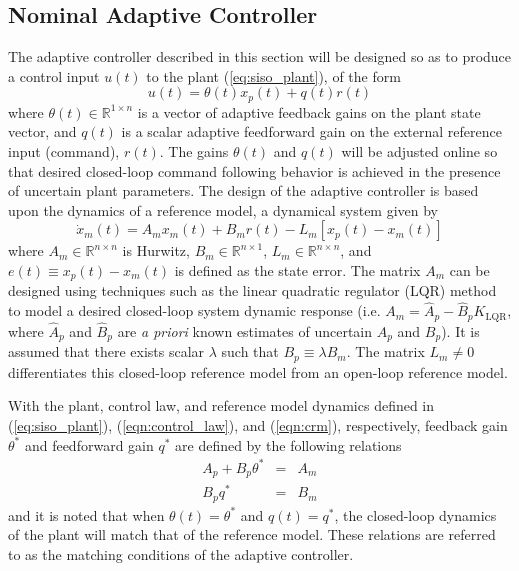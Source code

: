 \subsection{Nominal Adaptive Controller}
The adaptive controller described in this section will be designed so as to produce a control input $u(t)$ to the plant (\ref{eq:siso_plant}), of the form
\begin{equation}
	u(t) = \theta(t) x_p(t) + q(t) r(t)
	\label{eqn:control_law}
\end{equation}
\noindent where $\theta(t) \in \mathbb{R}^{1 \times n}$ is a vector of adaptive feedback gains on the plant state vector, and $q(t)$ is a scalar adaptive feedforward gain on the external reference input (command), $r(t)$. The gains $\theta(t)$ and $q(t)$ will be adjusted online so that desired closed-loop command following behavior is achieved in the presence of uncertain plant parameters. The design of the adaptive controller is based upon the dynamics of a reference model, a dynamical system given by
\begin{equation}
	\dot{x}_m(t) = A_m x_m(t) + B_m r(t) - L_m \left[x_p(t) - x_m(t)\right]
	\label{eqn:crm}
\end{equation}
\noindent where $A_m \in \mathbb{R}^{n \times n}$ is Hurwitz, $B_m \in \mathbb{R}^{n \times 1}$, $L_m \in \mathbb{R}^{n \times n}$, and $e(t) \equiv x_p(t) - x_m(t)$ is defined as the state error. The matrix $A_m$ can be designed using techniques such as the linear quadratic regulator (LQR) method to model a desired closed-loop system dynamic response (i.e. $A_m = \hat{A}_p - \hat{B}_p K_{\textrm{LQR}}$, where $\hat{A}_p$ and $\hat{B}_p$ are \textit{a priori} known estimates of uncertain $A_p$ and $B_p$). It is assumed that there exists scalar $\lambda$ such that $B_p \equiv \lambda B_m$. The matrix $L_m \neq 0$ differentiates this closed-loop reference model from an open-loop reference model. 

With the plant, control law, and reference model dynamics defined in (\ref{eq:siso_plant}), (\ref{eqn:control_law}), and (\ref{eqn:crm}), respectively, feedback gain $\theta^*$ and feedforward gain $q^*$ are defined by the following relations
\begin{eqnarray}
	A_p + B_p \theta^* &=& A_m \label{eqn:matchcond1} \\
	B_p q^* &=& B_m \label{eqn:matchcond2} 
\end{eqnarray}
and it is noted that when $\theta(t) = \theta^*$ and $q(t) = q^*$, the closed-loop dynamics of the plant will match that of the reference model. These relations are referred to as the matching conditions of the adaptive controller.

